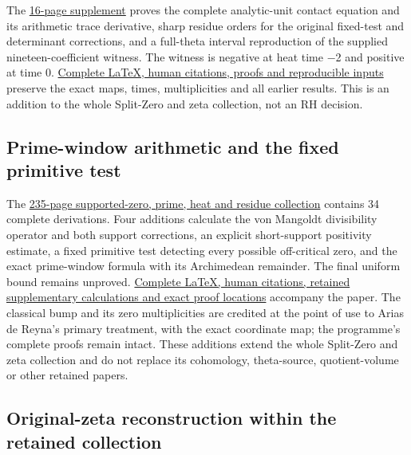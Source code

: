 \documentclass[
]{article}
\begin{document}
The
\href{https://github.com/KokunoYumeto/zeta-function-research-reader/blob/main/workbenches/splitzero-tandem/continuations/20260923-boundary-residue-arithmetic/BOUNDARY_RESIDUE_ARITHMETIC_RECEIVERS.pdf}{16-page
supplement} proves the complete analytic-unit contact equation and its
arithmetic trace derivative, sharp residue orders for the original
fixed-test and determinant corrections, and a full-theta interval
reproduction of the supplied nineteen-coefficient witness. The witness
is negative at heat time −2 and positive at time 0.
\href{https://github.com/KokunoYumeto/zeta-function-research-reader/blob/main/workbenches/splitzero-tandem/continuations/20260923-boundary-residue-arithmetic/README.md}{Complete
LaTeX, human citations, proofs and reproducible inputs} preserve the
exact maps, times, multiplicities and all earlier results. This is an
addition to the whole Split-Zero and zeta collection, not an RH
decision.

\subsection{Prime-window arithmetic and the fixed primitive
test}\label{prime-window-arithmetic-and-the-fixed-primitive-test}

The
\href{https://github.com/KokunoYumeto/zeta-function-research-reader/blob/main/workbenches/splitzero-tandem/branches/tau-zero-prime-positivity/TAU_ZERO_PRIME_POSITIVITY.pdf}{235-page
supported-zero, prime, heat and residue collection} contains 34 complete
derivations. Four additions calculate the von Mangoldt divisibility
operator and both support corrections, an explicit short-support
positivity estimate, a fixed primitive test detecting every possible
off-critical zero, and the exact prime-window formula with its
Archimedean remainder. The final uniform bound remains unproved.
\href{https://github.com/KokunoYumeto/zeta-function-research-reader/blob/main/workbenches/splitzero-tandem/branches/tau-zero-prime-positivity/PUBLICATION_COMPANION.md}{Complete
LaTeX, human citations, retained supplementary calculations and exact
proof locations} accompany the paper. The classical bump and its zero
multiplicities are credited at the point of use to Arias de Reyna's
primary treatment, with the exact coordinate map; the programme's
complete proofs remain intact. These additions extend the whole
Split-Zero and zeta collection and do not replace its cohomology,
theta-source, quotient-volume or other retained papers.

\subsection{Original-zeta reconstruction within the retained
collection}\label{original-zeta-reconstruction-within-the-retained-collection}
\end{document}

